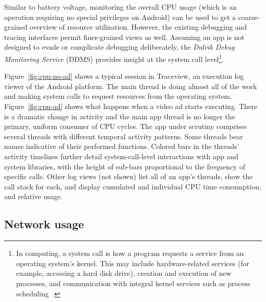 Similar to battery voltage, monitoring the overall CPU usage 
(which is an operation requiring no special privileges on Android) 
can be used to get a coarse-grained overview of resource utilization. 
However, the existing debugging and tracing interfaces permit 
finer-grained views as well. Assuming an app is not designed to 
evade or complicate debugging deliberately, the 
\textit{Dalvik Debug Monitoring Service} (DDMS) 
provides insight at the system call level\footnote{In computing, a system call is how a program requests a service from an operating system's kernel. This may include hardware-related services (for example, accessing a hard disk drive), creation and execution of new processes, and communication with integral kernel services such as process scheduling~\cite{syscall}.}.  

Figure~\ref{fig:cpu-no-ad} shows a typical  
session in Traceview, an execution log viewer of the Android platform.  The main thread is doing almost all of the work
and making system calls to request resources from the operating system.  Figure~\ref{fig:cpu-ad} shows what happens when a video ad starts 
executing.  There is a dramatic change in activity and the main app thread is no longer 
the primary, uniform consumer of CPU cycles.
The app under scrutiny comprises several threads with different 
temporal activity patterns. Some threads bear names indicative 
of their performed functions. Colored bars in the threads' activity 
timelines further detail system-call-level interactions with app and system 
libraries, with the height of sub-bars proportional to the frequency 
of specific calls.  
Other log views (not shown) list all of an app's threads, show the 
call stack for each, and display cumulated and individual CPU time 
consumption, and relative usage.



\subsection{Network usage}

